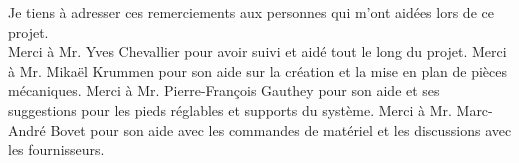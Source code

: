 Je tiens à adresser ces remerciements aux personnes qui m'ont aidées lors de ce projet.\\

Merci à Mr. Yves Chevallier pour avoir suivi et aidé tout le long du projet.
\newline
Merci à Mr. Mikaël Krummen pour son aide sur la création et la mise en plan de pièces mécaniques.
\newline
Merci à Mr. Pierre-François Gauthey pour son aide et ses suggestions pour les pieds réglables et supports du système.
\newline
Merci à Mr. Marc-André Bovet pour son aide avec les commandes de matériel et les discussions avec les fournisseurs.